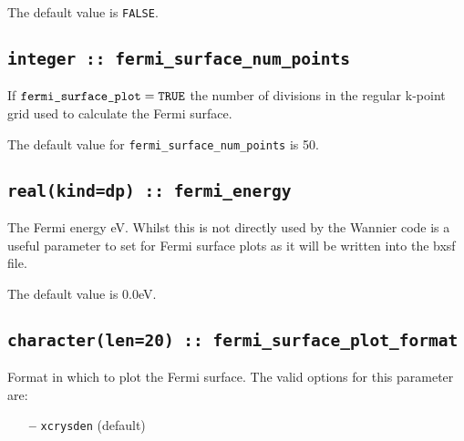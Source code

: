 The default value is \verb#FALSE#.


\subsection[fermi\_surface\_num\_points]{\tt integer :: fermi\_surface\_num\_points}

If $\verb#fermi_surface_plot#=\verb#TRUE#$ the number of divisions in
the regular k-point grid used to calculate the Fermi surface.

The default value for \verb#fermi_surface_num_points# is 50.


\subsection[fermi\_energy]{\tt real(kind=dp) :: fermi\_energy}
The Fermi energy eV. Whilst this is not directly used by the Wannier 
code is a useful parameter to set for Fermi surface plots as
it will be written into the bxsf file.

The default value is 0.0eV.


\subsection[fermi\_surface\_plot\_format]{\tt character(len=20) :: fermi\_surface\_plot\_format}

Format in which to plot the Fermi surface. 
The valid options for this parameter are:
\begin{itemize}
\item[{\bf --}] \verb#xcrysden#  (default)
\end{itemize}


%




